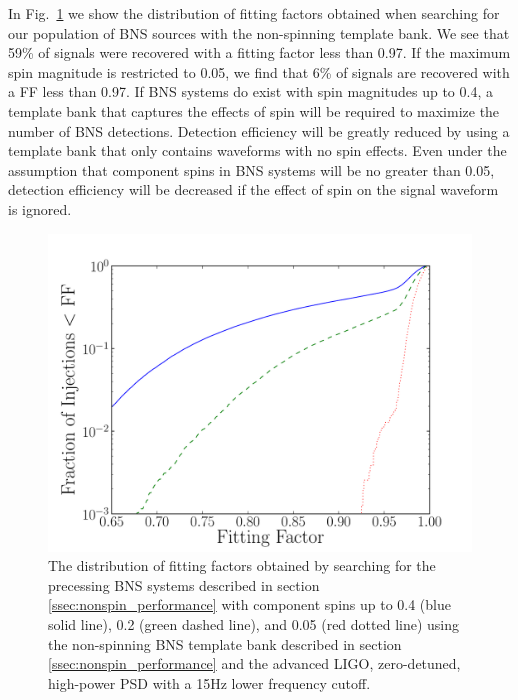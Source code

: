 In Fig.~\ref{fig:no_spin_cover} we show the distribution of fitting factors
obtained when searching for our population of BNS sources with the
non-spinning template bank. We see that 59\% of signals were recovered with a
fitting factor less than 0.97.  If the maximum spin magnitude is restricted to
0.05, we find that 6\% of signals are recovered with a FF less
than 0.97.  If BNS systems do exist with spin magnitudes up to 0.4, a template
bank that captures the effects of spin will be required to maximize the number
of BNS detections.  Detection efficiency will be greatly reduced by using a
template bank that only contains waveforms with no spin effects.  Even under
the assumption that component spins in BNS systems will be no greater
than 0.05, detection efficiency will be decreased if the effect of spin on the
signal waveform is ignored.

\begin{figure}
\begin{center}
\includegraphics[width=1.0\textwidth]{papers/bns_spin/figure1.pdf}
\end{center}
\caption{\label{fig:no_spin_cover} The distribution of fitting factors obtained by searching
for the precessing BNS systems described in section \ref{ssec:nonspin_performance}
with component spins up to 0.4 (blue solid line), 0.2 (green dashed line), and 0.05 (red dotted line) using the non-spinning
BNS template bank described in section \ref{ssec:nonspin_performance} and the advanced LIGO, zero-detuned,
high-power PSD with a 15Hz lower frequency cutoff.}
\end{figure}

